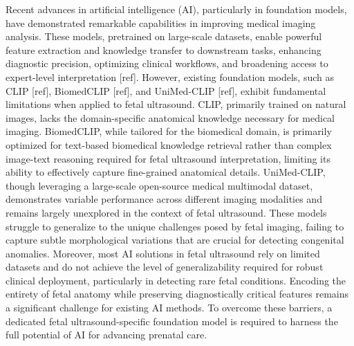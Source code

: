 Recent advances in artificial intelligence (AI), particularly in foundation models, have demonstrated remarkable capabilities in improving medical imaging analysis. These models, pretrained on large-scale datasets, enable powerful feature extraction and knowledge transfer to downstream tasks, enhancing diagnostic precision, optimizing clinical workflows, and broadening access to expert-level interpretation {\color{red}[ref]}. However, existing foundation models, such as CLIP {\color{red}[ref]}, BiomedCLIP {\color{red}[ref]}, and UniMed-CLIP {\color{red}[ref]}, exhibit fundamental limitations when applied to fetal ultrasound. CLIP, primarily trained on natural images, lacks the domain-specific anatomical knowledge necessary for medical imaging. BiomedCLIP, while tailored for the biomedical domain, is primarily optimized for text-based biomedical knowledge retrieval rather than complex image-text reasoning required for fetal ultrasound interpretation, limiting its ability to effectively capture fine-grained anatomical details. UniMed-CLIP, though leveraging a large-scale open-source medical multimodal dataset, demonstrates variable performance across different imaging modalities and remains largely unexplored in the context of fetal ultrasound. These models struggle to generalize to the unique challenges posed by fetal imaging, failing to capture subtle morphological variations that are crucial for detecting congenital anomalies. Moreover, most AI solutions in fetal ultrasound rely on limited datasets and do not achieve the level of generalizability required for robust clinical deployment, particularly in detecting rare fetal conditions. Encoding the entirety of fetal anatomy while preserving diagnostically critical features remains a significant challenge for existing AI methods. To overcome these barriers, a dedicated fetal ultrasound-specific foundation model is required to harness the full potential of AI for advancing prenatal care.

